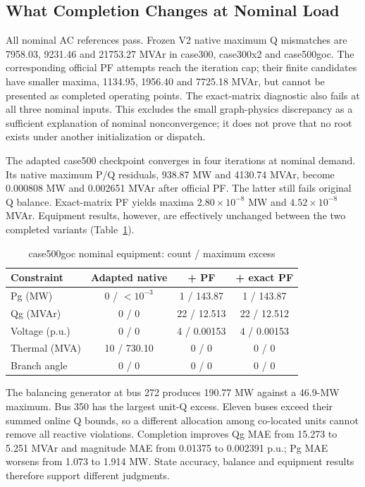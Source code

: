 \documentclass[conference,letterpaper]{IEEEtran}
\begin{document}
\subsection{What Completion Changes at Nominal Load}
All nominal AC references pass. Frozen V2 native maximum Q mismatches are 7958.03, 9231.46 and 21753.27 MVAr in case300, case300x2 and case500goc. The corresponding official PF attempts reach the iteration cap; their finite candidates have smaller maxima, 1134.95, 1956.40 and 7725.18 MVAr, but cannot be presented as completed operating points. The exact-matrix diagnostic also fails at all three nominal inputs. This excludes the small graph-physics discrepancy as a sufficient explanation of nominal nonconvergence; it does not prove that no root exists under another initialization or dispatch.

The adapted case500 checkpoint converges in four iterations at nominal demand. Its native maximum P/Q residuals, 938.87 MW and 4130.74 MVAr, become 0.000808 MW and 0.002651 MVAr after official PF. The latter still fails original Q balance. Exact-matrix PF yields maxima $2.80\times10^{-8}$ MW and $4.52\times10^{-8}$ MVAr. Equipment results, however, are effectively unchanged between the two completed variants (Table~\ref{tab:nominal}).

\begin{table}[t]
\caption{case500goc nominal equipment: count / maximum excess}
\label{tab:nominal}\centering\small
\begin{tabular}{lccc}\toprule
Constraint & Adapted native & + PF & + exact PF\\\midrule
Pg (MW) & 0 / $<10^{-3}$ & 1 / 143.87 & 1 / 143.87\\
Qg (MVAr) & 0 / 0 & 22 / 12.513 & 22 / 12.512\\
Voltage (p.u.) & 0 / 0 & 4 / 0.00153 & 4 / 0.00153\\
Thermal (MVA) & 10 / 730.10 & 0 / 0 & 0 / 0\\
Branch angle & 0 / 0 & 0 / 0 & 0 / 0\\\bottomrule
\end{tabular}
\end{table}

The balancing generator at bus 272 produces 190.77 MW against a 46.9-MW maximum. Bus 350 has the largest unit-Q excess. Eleven buses exceed their summed online Q bounds, so a different allocation among co-located units cannot remove all reactive violations. Completion improves Qg MAE from 15.273 to 5.251 MVAr and magnitude MAE from 0.01375 to 0.002391 p.u.; Pg MAE worsens from 1.073 to 1.914 MW. State accuracy, balance and equipment results therefore support different judgments.
\end{document}

